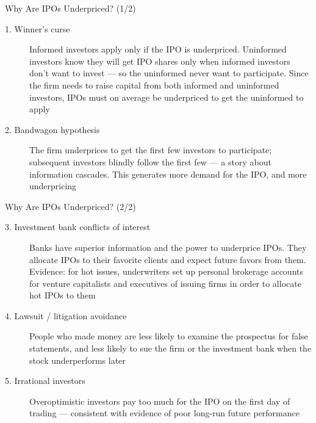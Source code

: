 \documentclass[aspectratio=169]{beamer}
\begin{document}
\begin{frame}{Why Are IPOs Underpriced? (1/2)}
\begin{description}
  \item[1. Winner's curse] Informed investors apply only if the IPO is underpriced. Uninformed investors know they will get IPO shares only when informed investors don't want to invest --- so the uninformed never want to participate. Since the firm needs to raise capital from both informed and uninformed investors, IPOs must on average be underpriced to get the uninformed to apply
  \item[2. Bandwagon hypothesis] The firm underprices to get the first few investors to participate; subsequent investors blindly follow the first few --- a story about information cascades. This generates more demand for the IPO, and more underpricing
\end{description}
\end{frame}

\begin{frame}{Why Are IPOs Underpriced? (2/2)}
\begin{description}
  \item[3. Investment bank conflicts of interest] Banks have superior information and the power to underprice IPOs. They allocate IPOs to their favorite clients and expect future favors from them. Evidence: for hot issues, underwriters set up personal brokerage accounts for venture capitalists and executives of issuing firms in order to allocate hot IPOs to them
  \item[4. Lawsuit / litigation avoidance] People who made money are less likely to examine the prospectus for false statements, and less likely to sue the firm or the investment bank when the stock underperforms later
  \item[5. Irrational investors] Overoptimistic investors pay too much for the IPO on the first day of trading --- consistent with evidence of poor long-run future performance
\end{description}
\end{frame}
\end{document}

